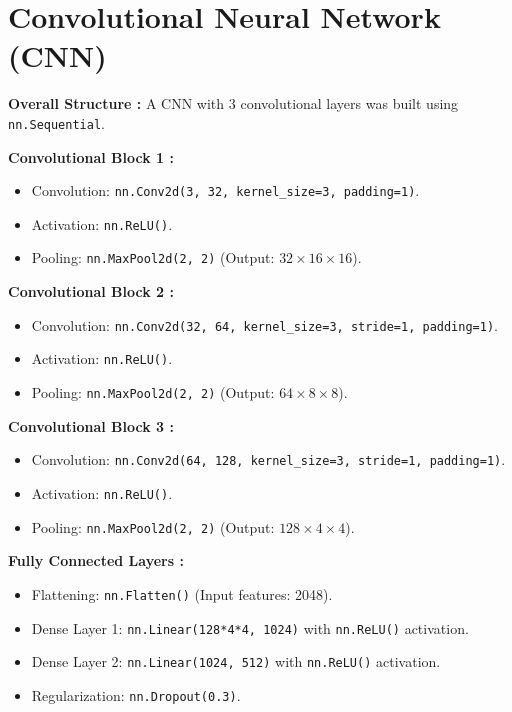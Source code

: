 \documentclass[12pt, a4paper]{report}
\begin{document}
\section{Convolutional Neural Network (CNN)}
\noindent \textbf{Overall Structure :} A CNN with 3 convolutional layers was built using \texttt{nn.Sequential}.
    
\noindent \textbf{Convolutional Block 1 :}
    \begin{itemize}
        \item Convolution: \texttt{nn.Conv2d(3, 32, kernel\_size=3, padding=1)}.
        \item Activation: \texttt{nn.ReLU()}.
        \item Pooling: \texttt{nn.MaxPool2d(2, 2)} (Output: $32 \times 16 \times 16$).
    \end{itemize}
    
\noindent \textbf{Convolutional Block 2 :}
    \begin{itemize}
        \item Convolution: \texttt{nn.Conv2d(32, 64, kernel\_size=3, stride=1, padding=1)}.
        \item Activation: \texttt{nn.ReLU()}.
        \item Pooling: \texttt{nn.MaxPool2d(2, 2)} (Output: $64 \times 8 \times 8$).
    \end{itemize}
    
\noindent \textbf{Convolutional Block 3 :}
    \begin{itemize}
        \item Convolution: \texttt{nn.Conv2d(64, 128, kernel\_size=3, stride=1, padding=1)}.
        \item Activation: \texttt{nn.ReLU()}.
        \item Pooling: \texttt{nn.MaxPool2d(2, 2)} (Output: $128 \times 4 \times 4$).
    \end{itemize}
    
\noindent \textbf{Fully Connected Layers :}
    \begin{itemize}
        \item Flattening: \texttt{nn.Flatten()} (Input features: 2048).
        \item Dense Layer 1: \texttt{nn.Linear(128*4*4, 1024)} with \texttt{nn.ReLU()} activation.
        \item Dense Layer 2: \texttt{nn.Linear(1024, 512)} with \texttt{nn.ReLU()} activation.
        \item Regularization: \texttt{nn.Dropout(0.3)}.
    \end{itemize}
    
\end{document}
